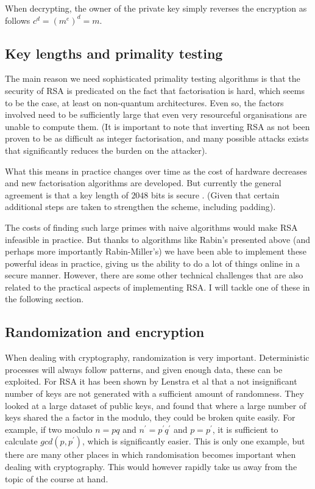 \documentclass[12pt]{report}
\begin{document}
When decrypting, the owner of the private key simply reverses the encryption as follows $c^d = (m^e)^d = m$.

\subsection*{Key lengths and primality testing}

The main reason we need sophisticated primality testing algorithms is that the security of RSA is predicated on the fact that factorisation is hard, which seems to be the case, at least on non-quantum architectures. Even so, the factors involved need to be sufficiently large that even very resourceful organisations are unable to compute them. (It is important to note that inverting RSA as not been proven to be as difficult as integer factorisation, and many possible attacks exists that significantly reduces the burden on the attacker).

What this means in practice changes over time as the cost of hardware decreases and new factorisation algorithms are developed. But currently the general agreement is that a key length of $2048$ bits is secure \cite{RSA}. (Given that certain additional steps are taken to strengthen the scheme, including padding).

The costs of finding such large primes with naive algorithms would make RSA infeasible in practice. But thanks to algorithms like Rabin's presented above (and perhaps more importantly Rabin-Miller's) we have been able to implement these powerful ideas in practice, giving us the ability to do a lot of things online in a secure manner. However, there are some other technical challenges that are also related to the practical aspects of implementing RSA. I will tackle one of these in the following section.

\subsection*{Randomization and encryption}

When dealing with cryptography, randomization is very important. Deterministic processes will always follow patterns, and given enough data, these can be exploited. For RSA it has been shown by Lenstra et al \cite{LENSTRA} that a not insignificant number of keys are not generated with a sufficient amount of randomness. They looked at a large dataset of public keys, and found that where a large number of keys shared the a factor in the modulo, they could be broken quite easily. For example, if two modulo $n=pq$ and $n^{\prime} = p^{\prime}q^{\prime}$ and $p=p^{\prime}$, it is sufficient to calculate $gcd(p,p^{\prime})$, which is significantly easier. This is only one example, but there are many other places in which randomisation becomes important when dealing with cryptography. This would however rapidly take us away from the topic of the course at hand.



\end{document}
